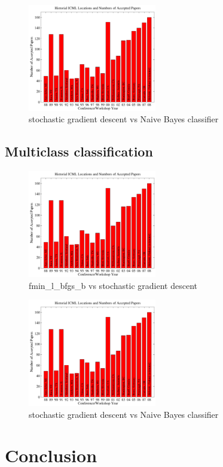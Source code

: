 \documentclass{article}
\begin{document}
\begin{figure}[H]
  \caption{stochastic gradient descent vs Naive Bayes classifier}
  \centering
    \includegraphics[width=0.5\textwidth]{icml_numpapers}
\end{figure}



\subsection{Multiclass classification}
\begin{figure}[H]
  \caption{fmin\_l\_bfgs\_b vs stochastic gradient descent}
  \centering
    \includegraphics[width=0.5\textwidth]{icml_numpapers}
\end{figure}


\begin{figure}[H]
  \caption{stochastic gradient descent vs Naive Bayes classifier}
  \centering
    \includegraphics[width=0.5\textwidth]{icml_numpapers}
\end{figure}





\section{Conclusion}
\nocite{langley00}



\end{document}
